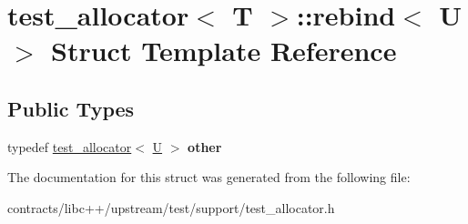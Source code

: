\hypertarget{structtest__allocator_1_1rebind}{}\section{test\+\_\+allocator$<$ T $>$\+:\+:rebind$<$ U $>$ Struct Template Reference}
\label{structtest__allocator_1_1rebind}
\subsection*{Public Types}
\begin{DoxyCompactItemize}
\item 
\mbox{\label{structtest__allocator_1_1rebind_abc15479c104c7f59385034e03ae8b319}} 
typedef \mbox{\hyperlink{classtest__allocator}{test\+\_\+allocator}}$<$ \mbox{\hyperlink{union_u}{U}} $>$ {\bfseries other}
\end{DoxyCompactItemize}


The documentation for this struct was generated from the following file\+:\begin{DoxyCompactItemize}
\item 
contracts/libc++/upstream/test/support/test\+\_\+allocator.\+h\end{DoxyCompactItemize}
